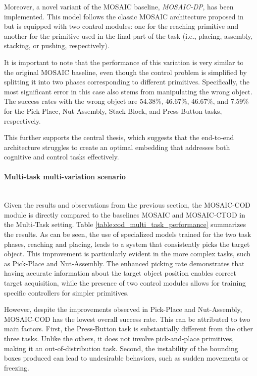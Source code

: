 Moreover, a novel variant of the MOSAIC baseline, \textit{MOSAIC-DP}, has been implemented. This model follows the classic MOSAIC architecture proposed in \cite{mandi2022towards_more_generalizable_one_shot} but is equipped with two control modules: one for the reaching primitive and another for the primitive used in the final part of the task (i.e., placing, assembly, stacking, or pushing, respectively). 

It is important to note that the performance of this variation is very similar to the original MOSAIC baseline, even though the control problem is simplified by splitting it into two phases corresponding to different primitives. Specifically, the most significant error in this case also stems from manipulating the wrong object. The success rates with the wrong object are 54.38\%, 46.67\%, 46.67\%, and 7.59\% for the Pick-Place, Nut-Assembly, Stack-Block, and Press-Button tasks, respectively. 

This further supports the central thesis, which suggests that the end-to-end architecture struggles to create an optimal embedding that addresses both cognitive and control tasks effectively.

\paragraph*{Multi-task multi-variation scenario}\mbox{}\\

Given the results and observations from the previous section, the MOSAIC-COD module is directly compared to the baselines MOSAIC and MOSAIC-CTOD in the Multi-Task setting. Table \ref{table:cod_multi_task_performance} summarizes the results. As can be seen, the use of specialized models trained for the two task phases, reaching and placing, leads to a system that consistently picks the target object. This improvement is particularly evident in the more complex tasks, such as Pick-Place and Nut-Assembly. The enhanced picking rate demonstrates that having accurate information about the target object position enables correct target acquisition, while the presence of two control modules allows for training specific controllers for simpler primitives.

However, despite the improvements observed in Pick-Place and Nut-Assembly, MOSAIC-COD has the lowest overall success rate. This can be attributed to two main factors. First, the Press-Button task is substantially different from the other three tasks. Unlike the others, it does not involve pick-and-place primitives, making it an out-of-distribution task. Second, the instability of the bounding boxes produced can lead to undesirable behaviors, such as sudden movements or freezing.

